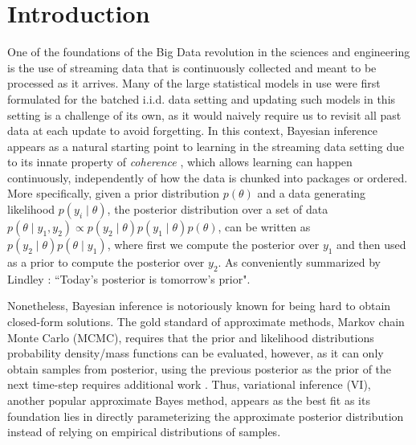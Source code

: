 \documentclass{article}
\theoremstyle{plain}
\theoremstyle{definition}
\theoremstyle{remark}
\theoremstyle{remark}
\begin{document}
\section{Introduction}
One of the foundations of the Big Data revolution in the sciences and engineering is the use of streaming data that is continuously collected and meant to be processed as it arrives.
Many of the large statistical models in use were first formulated for the batched i.i.d. data setting and updating such models in this setting is a challenge of its own, as it would naively require us to revisit all past data at each update to avoid forgetting. \cite{McCloskey1989,Goodfellow2014}
In this context, Bayesian inference appears as a natural starting point to learning in the streaming data setting due to its innate property of \textit{coherence} \cite{Bissiri2016}, which allows learning can happen continuously, independently of how the data is chunked into packages or ordered. More specifically, given a prior distribution $p(\theta)$ and a data generating likelihood $p(y_i \mid\theta)$, the posterior distribution over a set of data $p(\theta\mid y_1,y_2) \propto p(y_2 \mid\theta)p(y_1 \mid\theta)p(\theta)$, can be written as $p(y_2 \mid\theta)p(\theta\mid y_1)$, where first we compute the posterior over $y_1$ and then used as a prior to compute the posterior over $y_2$.
As conveniently summarized by Lindley \citep{lindley1972bayesian}: ``Today's posterior is tomorrow's prior".

Nonetheless, Bayesian inference is notoriously known for being hard to obtain closed-form solutions. The gold standard of approximate methods, Markov chain Monte Carlo (MCMC), requires that the prior and likelihood distributions probability density/mass functions can be evaluated, however, as it can only obtain samples from posterior, using the previous posterior as the prior of the next time-step requires additional work \cite{Broderick13}. Thus, variational inference (VI), another popular approximate Bayes method, appears as the best fit as its foundation lies in directly parameterizing the approximate posterior distribution instead of relying on empirical distributions of samples. 
\end{document}
